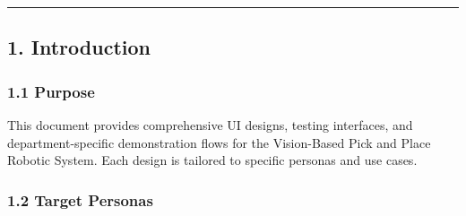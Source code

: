 \documentclass[
]{article}
\begin{document}
\begin{center}\rule{0.5\linewidth}{0.5pt}\end{center}

\hypertarget{introduction}{%
\subsection{1. Introduction}\label{introduction}}

\hypertarget{purpose}{%
\subsubsection{1.1 Purpose}\label{purpose}}

This document provides comprehensive UI designs, testing interfaces, and
department-specific demonstration flows for the Vision-Based Pick and
Place Robotic System. Each design is tailored to specific personas and
use cases.

\hypertarget{target-personas}{%
\subsubsection{1.2 Target Personas}\label{target-personas}}
\end{document}
